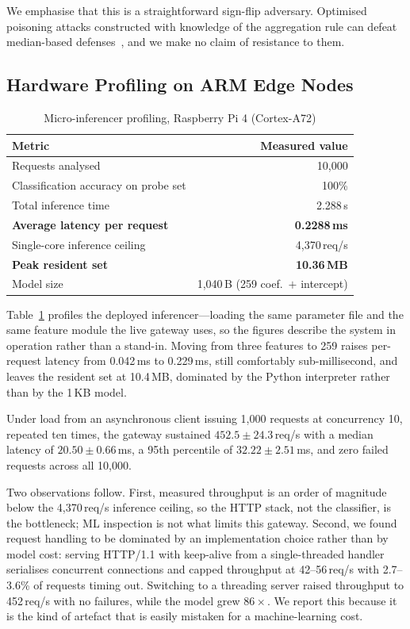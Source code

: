 \documentclass[conference]{IEEEtran}
\begin{document}
We emphasise that this is a straightforward sign-flip adversary. Optimised poisoning attacks constructed with knowledge of the aggregation rule can defeat median-based defenses~\cite{fang2020}, and we make no claim of resistance to them.

\subsection{Hardware Profiling on ARM Edge Nodes}
\label{sec:hardware}
\begin{table}[htbp]
\centering
\caption{Micro-inferencer profiling, Raspberry Pi 4 (Cortex-A72)}
\label{tab:hardware}
\setlength{\tabcolsep}{3pt}
\begin{tabular}{@{}lr@{}}
\toprule
\textbf{Metric} & \textbf{Measured value} \\ \midrule
Requests analysed & 10{,}000 \\
Classification accuracy on probe set & 100\% \\
Total inference time & 2.288\,s \\
\textbf{Average latency per request} & \textbf{0.2288\,ms} \\
Single-core inference ceiling & 4{,}370\,req/s \\
\textbf{Peak resident set} & \textbf{10.36\,MB} \\
Model size & 1{,}040\,B (259 coef.\ $+$ intercept) \\ \bottomrule
\end{tabular}
\end{table}

Table~\ref{tab:hardware} profiles the deployed inferencer---loading the same parameter file and the same feature module the live gateway uses, so the figures describe the system in operation rather than a stand-in. Moving from three features to 259 raises per-request latency from 0.042\,ms to 0.229\,ms, still comfortably sub-millisecond, and leaves the resident set at 10.4\,MB, dominated by the Python interpreter rather than by the 1\,KB model.

Under load from an asynchronous client issuing 1{,}000 requests at concurrency 10, repeated ten times, the gateway sustained $452.5 \pm 24.3$\,req/s with a median latency of $20.50 \pm 0.66$\,ms, a 95th percentile of $32.22 \pm 2.51$\,ms, and zero failed requests across all 10{,}000.

Two observations follow. First, measured throughput is an order of magnitude below the 4{,}370\,req/s inference ceiling, so the HTTP stack, not the classifier, is the bottleneck; ML inspection is not what limits this gateway. Second, we found request handling to be dominated by an implementation choice rather than by model cost: serving HTTP/1.1 with keep-alive from a single-threaded handler serialises concurrent connections and capped throughput at 42--56\,req/s with 2.7--3.6\% of requests timing out. Switching to a threading server raised throughput to 452\,req/s with no failures, while the model grew $86\times$. We report this because it is the kind of artefact that is easily mistaken for a machine-learning cost.
\end{document}
